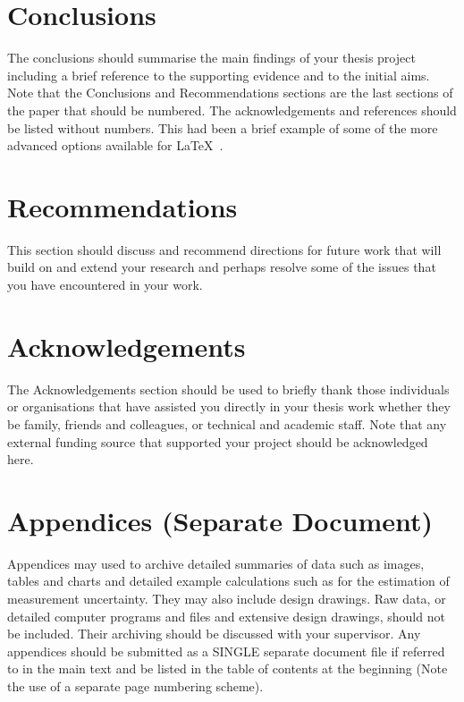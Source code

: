 \documentclass[]{aiaa-tc}%
\begin{document}

%
%
\section{Conclusions}
The conclusions should summarise the main findings of your thesis project including a brief reference to the supporting evidence and to the initial aims. Note that the Conclusions and Recommendations sections are the last sections of the paper that should be numbered. The acknowledgements and references should be listed without numbers.
This had been a brief example of some of the more advanced options available for \LaTeX\ .

\section{Recommendations}
This section should discuss and recommend directions for future work that will build on and extend your research and perhaps resolve some of the issues that you have encountered in your work.

\section*{Acknowledgements}
The Acknowledgements section should be used to briefly thank those individuals or organisations that have assisted you directly in your thesis work whether they be family, friends and colleagues, or technical and academic staff. Note that any external funding source that supported your project should be acknowledged here. 

\section*{Appendices (Separate Document)}
Appendices may used to archive detailed summaries of data such as images, tables and charts and detailed example calculations such as for the estimation of measurement uncertainty. They may also include design drawings. Raw data, or detailed computer programs and files and extensive design drawings, should not be included. Their archiving should be discussed with your supervisor. Any appendices should be submitted as a SINGLE separate document file if referred to in the main text and be listed in the table of contents at the beginning (Note the use of a separate page numbering scheme).
\end{document}
